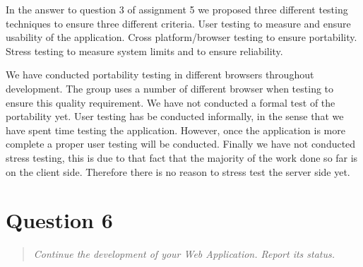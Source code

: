 \documentclass[10pt,a4paper]{report}
\begin{document}
In the answer to question 3 of assignment 5 we proposed three different testing techniques to ensure three different criteria. User testing to measure and ensure usability of the application. Cross platform/browser testing to ensure portability. Stress testing to measure system limits and to ensure reliability.

We have conducted portability testing in different browsers throughout development. The group uses a number of different browser when testing to ensure this quality requirement. We have not conducted a formal test of the portability yet. User testing has be conducted informally, in the sense that we have spent time testing the application. However, once the application is more complete a proper user testing will be conducted. Finally we have not conducted stress testing, this is due to that fact that the majority of the work done so far is on the client side. Therefore there is no reason to stress test the server side yet.

\section{Question 6}
\begin{quote}
\textit{Continue the development of your Web Application. Report its status.}
\end{quote}
\end{document}
